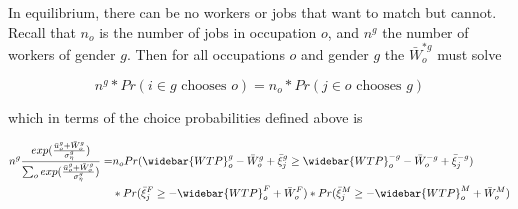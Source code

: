 \documentclass[11pt]{article}
\begin{document}






In equilibrium, there can be no workers or jobs that want to match but cannot. Recall that $n_o$ is the number of jobs in occupation $o$, and $n^g$ the number of workers of gender $g$. Then for all occupations $o$ and gender $g$ the $ \bar{W}^{*g}_o$ must solve

$$n^g*Pr(\text{$i \in g$ chooses } o)  =n_o*Pr(\text{$j \in o$ chooses } g) $$

which in terms of the choice probabilities defined above is


\begin{align*}
n^g\frac{exp(\frac{\bar{u}^{g}_o + \bar{W}^g_o}{\sigma^g_{\eta}})}{\sum_o exp(\frac{\bar{u}^{g}_o + \bar{W}^g_o}{\sigma^g_{\eta}})} =& n_oPr(\widebar{WTP}^g_o - \bar{W}^g_o + \bar{\xi}^g_j \geq \widebar{WTP}^{-g}_o - \bar{W}^{-g}_o + \bar{\xi}^{-g}_j) \\ 
& *Pr ( \bar{\xi}^F_j \geq {-\widebar{WTP}^F_o + \bar{W}^F_o} ) *Pr ( \bar{\xi}^M_j \geq {-\widebar{WTP}^M_o + \bar{W}^M_o} )     \\
\end{align*}
\end{document}
